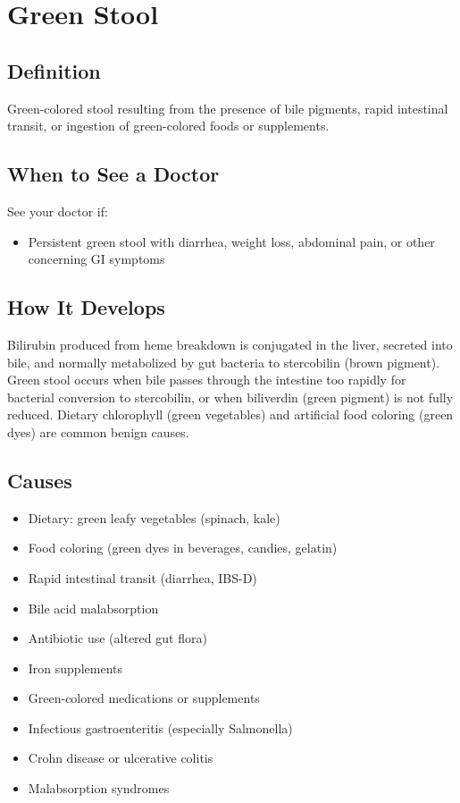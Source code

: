 \chapter{Green Stool}

\section*{Definition}
Green-colored stool resulting from the presence of bile pigments, rapid intestinal transit, or ingestion of green-colored foods or supplements.

\section*{When to See a Doctor}
See your doctor if:
\begin{itemize}
  \item Persistent green stool with diarrhea, weight loss, abdominal pain, or other concerning GI symptoms
\end{itemize}

\section*{How It Develops}
Bilirubin produced from heme breakdown is conjugated in the liver, secreted into bile, and normally metabolized by gut bacteria to stercobilin (brown pigment). Green stool occurs when bile passes through the intestine too rapidly for bacterial conversion to stercobilin, or when biliverdin (green pigment) is not fully reduced. Dietary chlorophyll (green vegetables) and artificial food coloring (green dyes) are common benign causes.

\section*{Causes}
\begin{itemize}
  \item Dietary: green leafy vegetables (spinach, kale)
  \item Food coloring (green dyes in beverages, candies, gelatin)
  \item Rapid intestinal transit (diarrhea, IBS-D)
  \item Bile acid malabsorption
  \item Antibiotic use (altered gut flora)
  \item Iron supplements
  \item Green-colored medications or supplements
  \item Infectious gastroenteritis (especially Salmonella)
  \item Crohn disease or ulcerative colitis
  \item Malabsorption syndromes
\end{itemize}

